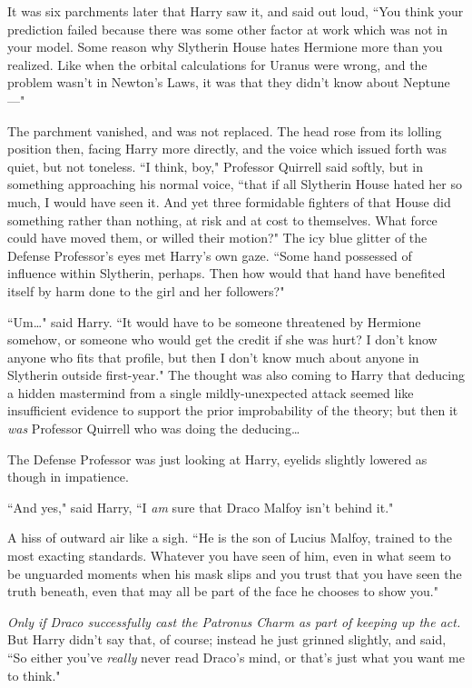 It was six parchments later that Harry saw it, and said out loud, ``You think your prediction failed because there was some other factor at work which was not in your model. Some reason why Slytherin House hates Hermione more than you realized. Like when the orbital calculations for Uranus were wrong, and the problem wasn't in Newton's Laws, it was that they didn't know about Neptune—"

The parchment vanished, and was not replaced. The head rose from its lolling position then, facing Harry more directly, and the voice which issued forth was quiet, but not toneless. ``I think, boy," Professor Quirrell said softly, but in something approaching his normal voice, ``that if all Slytherin House hated her so much, I would have seen it. And yet three formidable fighters of that House did something rather than nothing, at risk and at cost to themselves. What force could have moved them, or willed their motion?" The icy blue glitter of the Defense Professor's eyes met Harry's own gaze. ``Some hand possessed of influence within Slytherin, perhaps. Then how would that hand have benefited itself by harm done to the girl and her followers?"

``Um{\ldots}" said Harry. ``It would have to be someone threatened by Hermione somehow, or someone who would get the credit if she was hurt? I don't know anyone who fits that profile, but then I don't know much about anyone in Slytherin outside first-year." The thought was also coming to Harry that deducing a hidden mastermind from a single mildly-unexpected attack seemed like insufficient evidence to support the prior improbability of the theory; but then it \emph{was} Professor Quirrell who was doing the deducing{\ldots}

The Defense Professor was just looking at Harry, eyelids slightly lowered as though in impatience.

``And yes," said Harry, ``I \emph{am} sure that Draco Malfoy isn't behind it."

A hiss of outward air like a sigh. ``He is the son of Lucius Malfoy, trained to the most exacting standards. Whatever you have seen of him, even in what seem to be unguarded moments when his mask slips and you trust that you have seen the truth beneath, even that may all be part of the face he chooses to show you."

\emph{Only if Draco successfully cast the Patronus Charm as part of keeping up the act.} But Harry didn't say that, of course; instead he just grinned slightly, and said, ``So either you've \emph{really} never read Draco's mind, or that's just what you want me to think."

